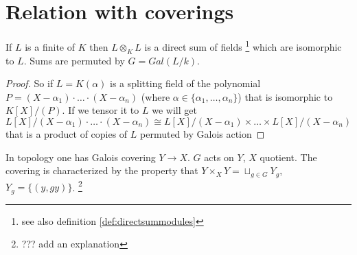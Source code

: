 \section{Relation with coverings}

\begin{remark}
  If $L$ is a finite  of $K$ then
  $ L \otimes_K L$ is a direct sum of fields
  \footnote{
    see also definition \ref{def:directsummodules}
  }
  which are
  isomorphic to $L$. Sums are permuted by $G = Gal\left(L/k\right)$.
  \begin{proof}
  So if $L = K\left(\alpha\right)$ is a splitting field of the
  polynomial $P = \left(X - \alpha_1\right) \cdot \dots \cdot \left(X
  - \alpha_n\right)$ (where $\alpha \in \{\alpha_1, \dots,
  \alpha_n\}$) that is isomorphic to $K\left[X\right]/(P)$. If 
  we tensor it to $L$ we will get
  \[
  L\left[X\right]/\left(X - \alpha_1\right) \cdot \dots \cdot \left(X
  - \alpha_n\right) \cong
  L\left[X\right]/\left(X - \alpha_1\right) \times
  \dots \times
  L\left[X\right]/\left(X - \alpha_n\right)
  \]
  that is a product of copies of $L$ permuted by Galois action
  \end{proof}
  \label{rem:lec8_1}
\end{remark}

In topology one has Galois covering $Y \to X$. $G$ acts on $Y$, $X$
quotient. The covering is characterized by the property that $Y
\times_X Y = \sqcup_{g \in G} Y_g$, $Y_g = \{\left(y, gy\right)\}$.
\footnote{
  ??? add an explanation
}
